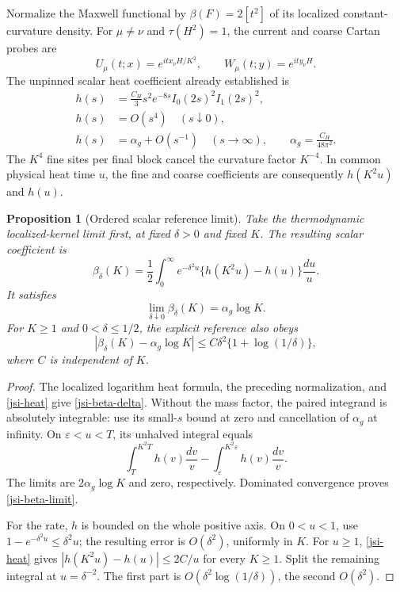 \documentclass[11pt]{article}
\newtheorem{proposition}[theorem]{Proposition}
\theoremstyle{remark}
\begin{document}
Normalize the Maxwell functional by
\(\beta(F)=2[t^2]\) of its localized constant-curvature density.
For \(\mu\ne\nu\) and \(\tau(H^2)=1\), the current and coarse
Cartan probes are
\[
 U_\mu(t;x)=e^{itx_\nu H/K^2},\qquad
 W_\mu(t;y)=e^{ity_\nu H}.
\]
The unpinned scalar heat coefficient already established is
\begin{equation}
 \begin{split}
 h(s)&=\frac{C_H}{3}s^2e^{-8s}I_0(2s)^2I_1(2s)^2,\\
 h(s)&=O(s^4)\quad(s\downarrow0),\\
 h(s)&=\alpha_g+O(s^{-1})\quad(s\to\infty),
 \qquad \alpha_g=\frac{C_H}{48\pi^2}.
 \end{split}
 \label{jsi-heat}
\end{equation}
The \(K^4\) fine sites per final block cancel the curvature
factor \(K^{-4}\). In common physical heat time \(u\), the fine
and coarse coefficients are consequently \(h(K^2u)\) and \(h(u)\).

\begin{proposition}[Ordered scalar reference limit]
\label{jsi-ordered-theorem}
Take the thermodynamic localized-kernel limit first, at fixed
\(\delta>0\) and fixed \(K\). The resulting scalar coefficient is
\begin{equation}
 \beta_\delta(K)=\frac12\int_0^\infty
           e^{-\delta^2u}\{h(K^2u)-h(u)\}\frac{du}{u}.
 \label{jsi-beta-delta}
\end{equation}
It satisfies
\begin{equation}
             \lim_{\delta\downarrow0}\beta_\delta(K)
                         =\alpha_g\log K.
 \label{jsi-beta-limit}
\end{equation}
For \(K\ge1\) and \(0<\delta\le1/2\), the explicit reference
also obeys
\begin{equation}
 |\beta_\delta(K)-\alpha_g\log K|
       \le C\delta^2\{1+\log(1/\delta)\},
 \label{jsi-mass-rate}
\end{equation}
where \(C\) is independent of \(K\).
\end{proposition}

\begin{proof}
The localized logarithm heat formula, the preceding normalization,
and \eqref{jsi-heat} give \eqref{jsi-beta-delta}.
Without the mass factor, the paired integrand is absolutely
integrable: use its small-\(s\) bound at zero and cancellation
of \(\alpha_g\) at infinity. On \(\varepsilon<u<T\), its
unhalved integral equals
\[
 \int_T^{K^2T}h(v)\frac{dv}{v}
       -\int_\varepsilon^{K^2\varepsilon}h(v)\frac{dv}{v}.
\]
The limits are \(2\alpha_g\log K\) and zero, respectively.
Dominated convergence proves \eqref{jsi-beta-limit}.

For the rate, \(h\) is bounded on the whole positive axis.
On \(0<u<1\), use \(1-e^{-\delta^2u}\le\delta^2u\);
the resulting error is \(O(\delta^2)\), uniformly in \(K\).
For \(u\ge1\), \eqref{jsi-heat} gives
\(|h(K^2u)-h(u)|\le2C/u\) for every \(K\ge1\).
Split the remaining integral at \(u=\delta^{-2}\).
The first part is \(O(\delta^2\log(1/\delta))\), the
second \(O(\delta^2)\).
\end{proof}
\end{document}

